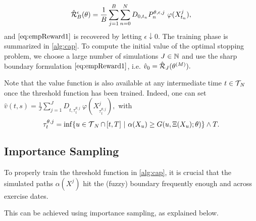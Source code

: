\begin{equation}\label{eq:empReward2}
\hat{\operatorname{\mathcal{R}}}_B^{\epsilon}(\theta) =  \frac{1}{B}\sum_{j=1}^B  \sum_{n=0}^N D_{0,t_n}   P^{\theta,\epsilon,j}_{n}\ \varphi(X_{t_n}^j),
\end{equation}
and $\eqref{eq:empReward1}$ is recovered by letting $\epsilon  \downarrow 0$. 
The training phase is summarized in \cref{alg:cap}. To compute the initial value of the optimal stopping problem, we choose a large number of simulations $J\in \operatorname{\mathbb{N}}$ and use the sharp boundary formulation $\eqref{eq:empReward1}$, i.e.   
$ \hat{v}_0 = \hat{\operatorname{\mathcal{R}}}_J(\theta^{(M)}) .$ 
 \begin{remark}
 Note that the value function is also  available at any intermediate time $t\in \operatorname{\mathcal{T}}_{\!N}$ once the threshold function has been trained. Indeed, one  can set 
 $\hat{v}(t,s) = \frac{1}{J}\sum_{j=1}^J   D_{t,\tau_t^{\theta,j}}  \ \varphi(X_{\tau_t^{\theta,j}}^j),$ 
 with $$\tau_t^{\theta,j} = \inf\{u \in \operatorname{\mathcal{T}}_{N} \cap \, [t,T]\ | \ \alpha(X_u) \ge G(u,\Xi(X_u); \theta) \} \wedge T.$$
 \end{remark}
 
\subsection{Importance Sampling}
To properly train the threshold function in \cref{alg:cap}, 
it is  crucial  that the simulated paths $\alpha(X^{j})$ hit the (fuzzy) boundary frequently enough and  across exercise dates. 
 
This can be achieved using importance sampling, as explained below.  

